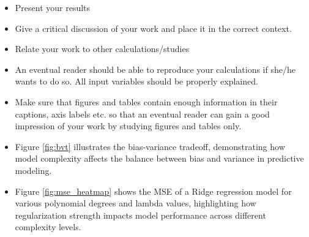 \documentclass[amssymb,twocolumn,aps]{revtex4}
\begin{document}
\begin{itemize}
    \item Present your results
    \item Give a critical discussion of your work and place it in the correct context.
    \item Relate your work to other calculations/studies
    \item An eventual reader should be able to reproduce your calculations if she/he wants to do so. All input variables should be properly explained.
    \item Make sure that figures and tables contain enough information in their captions, axis labels etc. so that an eventual reader can gain a good impression of your work by studying figures and tables only.
    \item Figure \ref{fig:bvt} illustrates the bias-variance tradeoff, demonstrating how model complexity affects the balance between bias and variance in predictive modeling.
    \item Figure \ref{fig:mse_heatmap} shows the MSE of a Ridge regression model for various polynomial degrees and lambda values, highlighting how regularization strength impacts model performance across different complexity levels.
\end{itemize}
\end{document}
